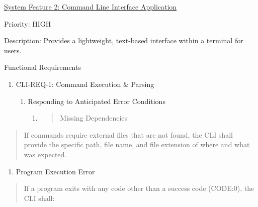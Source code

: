 \documentclass[
]{article}
\begin{document}
\ul{System Feature 2: Command Line Interface Application}

Priority: HIGH

Description: Provides a lightweight, text-based interface within a
terminal for users.

Functional Requirements

\begin{enumerate}
\def\labelenumi{\Roman{enumi})}
\item
  CLI-REQ-1: Command Execution \& Parsing

  \begin{enumerate}
  \def\labelenumii{\alph{enumii}.}
  \item
    Responding to Anticipated Error Conditions

    \begin{enumerate}
    \def\labelenumiii{\roman{enumiii}.}
    \item
      \begin{quote}
      Missing Dependencies
      \end{quote}
    \end{enumerate}
  \end{enumerate}
\end{enumerate}

\begin{quote}
If commands require external files that are not found, the CLI shall
provide the specific path, file name, and file extension of where and
what was expected.
\end{quote}

\begin{enumerate}
\def\labelenumi{\roman{enumi}.}
\setcounter{enumi}{1}
\item
  Program Execution Error
\end{enumerate}

\begin{quote}
If a program exits with any code other than a success code (CODE:0), the
CLI shall:
\end{quote}
\end{document}
